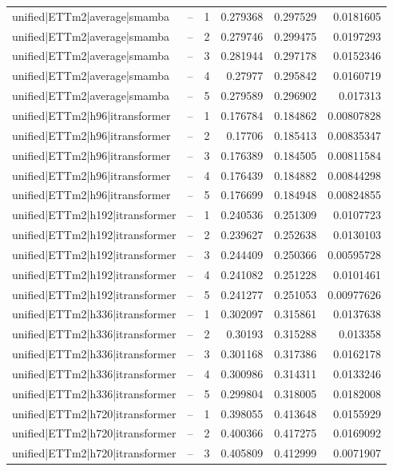 \begin{longtable}{llrrrr}
unified|ETTm2|average|smamba & -- & 1 & 0.279368 & 0.297529 & 0.0181605 \\
unified|ETTm2|average|smamba & -- & 2 & 0.279746 & 0.299475 & 0.0197293 \\
unified|ETTm2|average|smamba & -- & 3 & 0.281944 & 0.297178 & 0.0152346 \\
unified|ETTm2|average|smamba & -- & 4 & 0.27977 & 0.295842 & 0.0160719 \\
unified|ETTm2|average|smamba & -- & 5 & 0.279589 & 0.296902 & 0.017313 \\
unified|ETTm2|h96|itransformer & -- & 1 & 0.176784 & 0.184862 & 0.00807828 \\
unified|ETTm2|h96|itransformer & -- & 2 & 0.17706 & 0.185413 & 0.00835347 \\
unified|ETTm2|h96|itransformer & -- & 3 & 0.176389 & 0.184505 & 0.00811584 \\
unified|ETTm2|h96|itransformer & -- & 4 & 0.176439 & 0.184882 & 0.00844298 \\
unified|ETTm2|h96|itransformer & -- & 5 & 0.176699 & 0.184948 & 0.00824855 \\
unified|ETTm2|h192|itransformer & -- & 1 & 0.240536 & 0.251309 & 0.0107723 \\
unified|ETTm2|h192|itransformer & -- & 2 & 0.239627 & 0.252638 & 0.0130103 \\
unified|ETTm2|h192|itransformer & -- & 3 & 0.244409 & 0.250366 & 0.00595728 \\
unified|ETTm2|h192|itransformer & -- & 4 & 0.241082 & 0.251228 & 0.0101461 \\
unified|ETTm2|h192|itransformer & -- & 5 & 0.241277 & 0.251053 & 0.00977626 \\
unified|ETTm2|h336|itransformer & -- & 1 & 0.302097 & 0.315861 & 0.0137638 \\
unified|ETTm2|h336|itransformer & -- & 2 & 0.30193 & 0.315288 & 0.013358 \\
unified|ETTm2|h336|itransformer & -- & 3 & 0.301168 & 0.317386 & 0.0162178 \\
unified|ETTm2|h336|itransformer & -- & 4 & 0.300986 & 0.314311 & 0.0133246 \\
unified|ETTm2|h336|itransformer & -- & 5 & 0.299804 & 0.318005 & 0.0182008 \\
unified|ETTm2|h720|itransformer & -- & 1 & 0.398055 & 0.413648 & 0.0155929 \\
unified|ETTm2|h720|itransformer & -- & 2 & 0.400366 & 0.417275 & 0.0169092 \\
unified|ETTm2|h720|itransformer & -- & 3 & 0.405809 & 0.412999 & 0.0071907 \\

\end{longtable}
